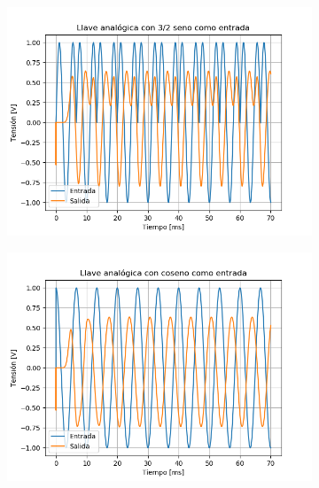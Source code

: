 \begin{figure}[H]
\centering
\begin{subfigure}{.49\textwidth}
	\centering
	\includegraphics[width=\textwidth]{ImagenesEjercicio6/LA - 3 2.png}
\end{subfigure}
\begin{subfigure}{.49\textwidth}
	\centering
	\includegraphics[width=\textwidth]{ImagenesEjercicio6/LA - Cos.png}
\end{subfigure}
\end{figure}
